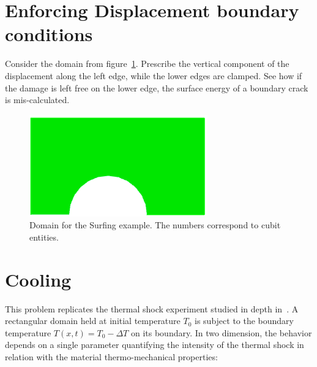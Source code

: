 \documentclass[10pt,oneside]{memoir}
\begin{document}
\section{Enforcing Displacement boundary conditions}
Consider the domain from figure~\ref{fig:BC}. Prescribe the vertical component of the displacement along the left edge, while the lower edges are clamped. See how if the damage is left free on the lower edge, the surface energy of a boundary crack is mis-calculated.
\begin{figure}[H]
\centering
\includegraphics[width=.45\textwidth]{Examples/BC/Geometry.png}
\caption{Domain for the Surfing example. The numbers correspond to cubit entities.}
\label{fig:BC}
\end{figure}



\section{Cooling}
This problem replicates the thermal shock experiment studied in depth in~\cite{Sicsic-Marigo-2013a,Bourdin-Marigo-EtAl-2014a}. A rectangular domain held at initial temperature $T_0$ is subject to the boundary temperature $T(x,t) = T_0 - \Delta T$ on its boundary. In two dimension, the behavior depends on a single parameter quantifying the intensity of the thermal shock in relation with the material thermo-mechanical properties:
\end{document}
